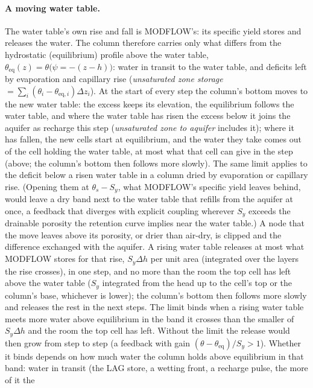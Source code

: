 \paragraph{A moving water table.} The water table's own rise and fall is MODFLOW's: its specific yield stores and
releases the water. The column therefore carries only what differs from the hydrostatic (equilibrium) profile above
the water table, $\theta_{\mathrm{eq}}(z)=\theta\big(\psi=-(z-h)\big)$: water in transit to the water table, and
deficits left by evaporation and capillary rise (\emph{unsaturated zone storage}
$=\sum_i(\theta_i-\theta_{\mathrm{eq},i})\Delta z_i$). At the start of every step the column's bottom moves to the new
water table: the excess keeps its elevation, the equilibrium follows the water table, and where the water table has
risen the excess below it joins the aquifer as recharge this step (\emph{unsaturated zone to aquifer} includes it);
where it has fallen, the new cells start at equilibrium, and the water they take comes out of the cell holding the
water table, at most what that cell can give in the step (above; the column's bottom then follows more slowly). The
same limit applies to the deficit below a risen water table in a column dried by evaporation or capillary rise. (Opening them at $\theta_s-S_y$, what MODFLOW's specific yield
leaves behind, would leave a dry band next to the water table that refills from the aquifer at once, a feedback that
diverges with explicit coupling wherever $S_y$ exceeds the drainable porosity the retention curve implies near the
water table.) A node that the move leaves above its porosity, or drier than air-dry, is clipped and the difference
exchanged with the aquifer. A rising water table releases at most what MODFLOW stores for that rise, $S_y\Delta h$ per
unit area (integrated over the layers the rise crosses), in one step, and no more than the room the top cell has left
above the water table ($S_y$ integrated from the head up to the cell's top or the column's base, whichever is lower); the column's bottom then follows more slowly and releases the rest in the next steps. The
limit binds when a rising water table meets more water above equilibrium in the band it crosses than the smaller of
$S_y\Delta h$ and the room the top cell has left.
Without the limit the release would then grow from step to step (a feedback with gain
$(\theta-\theta_{\mathrm{eq}})/S_y>1$). Whether it binds depends on how much water the column holds above equilibrium
in that band: water in transit (the LAG store, a  wetting front, a recharge pulse, the more of it the
